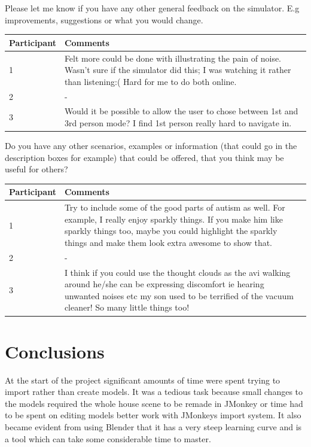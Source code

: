 \documentclass[11pt]{report}
\begin{document}
Please let me know if you have any other general feedback on the simulator. E.g improvements, suggestions or what you would change.
\begin{table}[H]
    \begin{tabular}{| p{3cm} | p{12cm} |}
    \hline
     Participant & Comments \\ \hline
     1 & Felt more could be done with illustrating the pain of noise. Wasn't sure if the simulator did this; I was watching it rather than listening:( Hard for me to do both online. \\ \hline
     2 & - \\ \hline
     3 & Would it be possible to allow the user to chose between 1st and 3rd person mode? I find 1st person really hard to navigate in. \\ \hline
    \end{tabular}
\end{table}

Do you have any other scenarios, examples or information (that could go in the description boxes for example) that could be offered, that you think may be useful for others?

\begin{table}[H]
    \begin{tabular}{| p{3cm} | p{12cm} |}
    \hline
     Participant & Comments \\ \hline
     1 & Try to include some of the good parts of autism as well. For example, I really enjoy sparkly things. If you make him like sparkly things too, maybe you could highlight the sparkly things and make them look extra awesome to show that.  \\ \hline
     2 & - \\ \hline
     3 & I think if you could use the thought clouds as the avi walking around he/she can be expressing discomfort ie hearing unwanted noises etc my son used to be terrified of the vacuum cleaner! So many little things too! \\ \hline
    \end{tabular}
\end{table}


\section{Conclusions}

At the start of the project significant amounts of time were spent trying to import rather than create models. It was a tedious task because small changes to the models required the whole house scene to be remade in JMonkey or time had to be spent on editing models better work with JMonkeys import system. It also became evident from using Blender that it has a very steep learning curve and is a tool which can take some considerable time to master.
\end{document}
